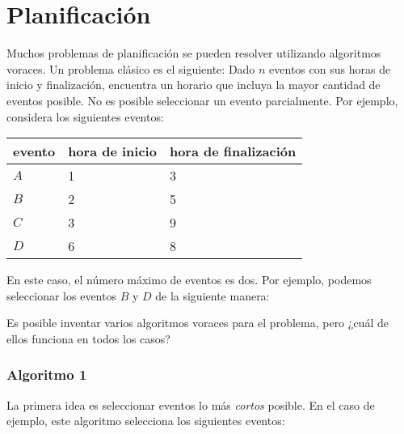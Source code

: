 \section{Planificación}

Muchos problemas de planificación se pueden resolver
utilizando algoritmos voraces.
Un problema clásico es el siguiente:
Dado $n$ eventos con sus horas de inicio y finalización,
encuentra un horario
que incluya la mayor cantidad de eventos posible.
No es posible seleccionar un evento parcialmente.
Por ejemplo, considera los siguientes eventos:
\begin{center}
\begin{tabular}{lll}
evento & hora de inicio & hora de finalización \\
\hline
$A$ & 1 & 3 \\
$B$ & 2 & 5 \\
$C$ & 3 & 9 \\
$D$ & 6 & 8 \\
\end{tabular}
\end{center}
En este caso, el número máximo de eventos es dos.
Por ejemplo, podemos seleccionar los eventos $B$ y $D$
de la siguiente manera:
\begin{center}
\end{center}

Es posible inventar varios algoritmos voraces
para el problema, pero ¿cuál de ellos funciona en todos los casos?

\subsubsection*{Algoritmo 1}

La primera idea es seleccionar eventos lo más \emph{cortos}
posible.
En el caso de ejemplo, este algoritmo
selecciona los siguientes eventos:
\begin{center}
\end{center}

